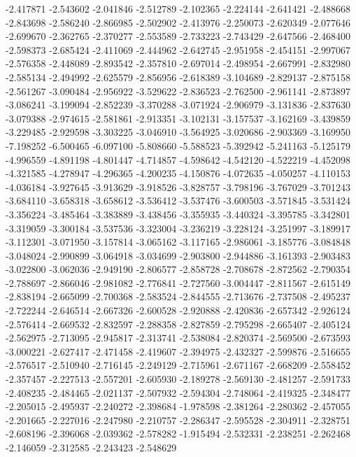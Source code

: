 -2.417871
-2.543602
-2.041846
-2.512789
-2.102365
-2.224144
-2.641421
-2.488668
-2.843698
-2.586240
-2.866985
-2.502902
-2.413976
-2.250073
-2.620349
-2.077646
-2.699670
-2.362765
-2.370277
-2.553589
-2.733223
-2.743429
-2.647566
-2.468400
-2.598373
-2.685424
-2.411069
-2.444962
-2.642745
-2.951958
-2.454151
-2.997067
-2.576358
-2.448089
-2.893542
-2.357810
-2.697014
-2.498954
-2.667991
-2.832980
-2.585134
-2.494992
-2.625579
-2.856956
-2.618389
-3.104689
-2.829137
-2.875158
-2.561267
-3.090484
-2.956922
-3.529622
-2.836523
-2.762500
-2.961141
-2.873897
-3.086241
-3.199094
-2.852239
-3.370288
-3.071924
-2.906979
-3.131836
-2.837630
-3.079388
-2.974615
-2.581861
-2.913351
-3.102131
-3.157537
-3.162169
-3.439859
-3.229485
-2.929598
-3.303225
-3.046910
-3.564925
-3.020686
-2.903369
-3.169950
-7.198252
-6.500465
-6.097100
-5.808660
-5.588523
-5.392942
-5.241163
-5.125179
-4.996559
-4.891198
-4.801447
-4.714857
-4.598642
-4.542120
-4.522219
-4.452098
-4.321585
-4.278947
-4.296365
-4.200235
-4.150876
-4.072635
-4.050257
-4.110153
-4.036184
-3.927645
-3.913629
-3.918526
-3.828757
-3.798196
-3.767029
-3.701243
-3.684110
-3.658318
-3.658612
-3.536412
-3.537476
-3.600503
-3.571845
-3.531424
-3.356224
-3.485464
-3.383889
-3.438456
-3.355935
-3.440324
-3.395785
-3.342801
-3.319059
-3.300184
-3.537536
-3.323004
-3.236219
-3.228124
-3.251997
-3.189917
-3.112301
-3.071950
-3.157814
-3.065162
-3.117165
-2.986061
-3.185776
-3.084848
-3.048024
-2.990899
-3.064918
-3.034699
-2.903800
-2.944886
-3.161393
-2.903483
-3.022800
-3.062036
-2.949190
-2.806577
-2.858728
-2.708678
-2.872562
-2.790354
-2.788697
-2.866046
-2.981082
-2.776841
-2.727560
-3.004447
-2.811567
-2.615149
-2.838194
-2.665099
-2.700368
-2.583524
-2.844555
-2.713676
-2.737508
-2.495237
-2.722244
-2.646514
-2.667326
-2.600528
-2.920888
-2.420836
-2.657342
-2.926124
-2.576414
-2.669532
-2.832597
-2.288358
-2.827859
-2.795298
-2.665407
-2.405124
-2.562975
-2.713095
-2.945817
-2.313741
-2.538084
-2.820374
-2.569500
-2.673593
-3.000221
-2.627417
-2.471458
-2.419607
-2.394975
-2.432327
-2.599876
-2.516655
-2.576517
-2.510940
-2.716145
-2.249129
-2.715961
-2.671167
-2.668209
-2.558452
-2.357457
-2.227513
-2.557201
-2.605930
-2.189278
-2.569130
-2.481257
-2.591733
-2.408235
-2.484465
-2.021137
-2.507932
-2.594304
-2.748064
-2.419325
-2.348477
-2.205015
-2.495937
-2.240272
-2.398684
-1.978598
-2.381264
-2.280362
-2.457055
-2.201665
-2.227016
-2.247980
-2.210757
-2.286347
-2.595528
-2.304911
-2.328751
-2.608196
-2.396068
-2.039362
-2.578282
-1.915494
-2.532331
-2.238251
-2.262468
-2.146059
-2.312585
-2.243423
-2.548629

